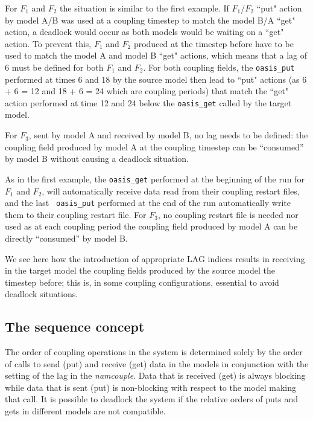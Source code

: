 \begin{enumerate}
  For $F_1$ and $F_2$ the situation is similar to the first
  example. If $F_1$/$F_2$ ``put" action by model A/B was used at a
  coupling timestep to match the model B/A ``get" action, a deadlock
  would occur as both models would be waiting on a ``get" action. To
  prevent this, $F_1$ and $F_2$ produced at the timestep before have
  to be used to match the model A and model B ``get" actions, which
  means that a lag of 6 must be defined for both $F_1$ and $F_2$. For
  both coupling fields, the {\tt oasis\_put} performed at times 6 and
  18 by the source model then lead to ``put" actions (as 6 + 6 = 12
  and 18 + 6 = 24 which are coupling periods) that match the ``get"
  action performed at time 12 and 24 below the {\tt oasis\_get} called
  by the target model.

  For $F_3$, sent by model A and received by model B, no lag needs to
  be defined: the coupling field produced by model A at the coupling
  timestep can be ``consumed'' by model B without causing a deadlock
  situation.

  As in the first example, the {\tt oasis\_get} performed at the
  beginning of the run for $F_1$ and $F_2$, will automatically receive
  data read from their coupling restart files, and the last {\tt
    oasis\_put} performed at the end of the run automatically write
  them to their coupling restart file. For $F_3$, no coupling restart
  file is needed nor used as at each coupling period the coupling
  field produced by model A can be directly ``consumed'' by model B.

  We see here how the introduction of appropriate LAG indices results
  in receiving in the target model the coupling fields produced by the
  source model the timestep before; this is, in some coupling
  configurations, essential to avoid deadlock situations.

\end{enumerate}

\vspace{-0.3cm}
\subsection{The sequence concept}
\label{subsec_sec}

The order of coupling operations in the system is determined solely by
the order of calls to send (put) and receive (get) data in the models
in conjunction with the setting of the lag in the {\it namcouple}.
Data that is received (get) is always blocking while data that is sent
(put) is non-blocking with respect to the model making that call.  It
is possible to deadlock the system if the relative orders of puts and
gets in different models are not compatible.

